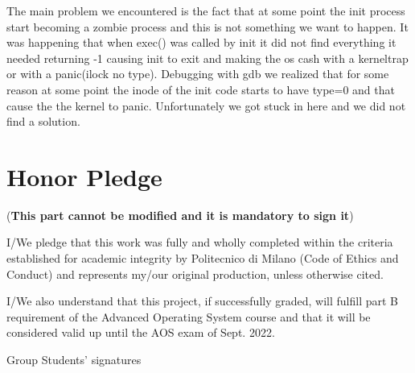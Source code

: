 \documentclass{article}
\begin{document}
The main problem we encountered is the fact that at some point the init process start becoming a zombie process and this is not something we want to happen. It was happening that when exec() was called by init it did not find everything it needed returning -1 causing init to exit and making the os cash with a kerneltrap or with a panic(ilock no type). Debugging with gdb we realized that for some reason at some point the inode of the init code starts to have type=0 and that cause the the kernel to panic. Unfortunately we got stuck in here and we did not find a solution.

\section{Honor Pledge}
(\textbf{This part cannot be modified and it is mandatory to sign it})

I/We pledge that this work was fully and wholly completed within the criteria
established for academic integrity by Politecnico di Milano (Code of Ethics and
Conduct) and represents my/our original production, unless otherwise cited.

I/We also understand that this project, if successfully graded,  will fulfill part B requirement of the
Advanced Operating System course and that it will be considered valid up until
the AOS exam of Sept. 2022.

\begin{flushright}
Group Students' signatures
\end{flushright}
\end{document}
